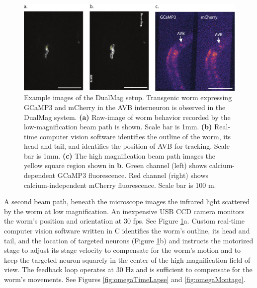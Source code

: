 \begin{figure}  %
\includegraphics[width=\textwidth]{figures/omegaDualMagImagesWithScale}
\caption[Example images from the DualMag setup.]{Example images of the DualMag setup. Transgenic worm expressing GCaMP3 and mCherry in the AVB interneuron is observed in the DualMag system. \textbf{(a)} Raw-image of worm behavior recorded by the low-magnification beam path is shown. Scale bar is 1mm.  \textbf{(b)} Real-time computer vision software identifies the outline of the worm, its head and tail, and identifies the position of AVB for tracking. Scale bar is 1mm. \textbf{(c)} The high magnification beam path images the yellow square region shown in \textbf{b}. Green channel (left) shows calcium-dependent GCaMP3 fluorescence. Red channel (right) shows calcium-independent mCherry fluorescence. Scale bar is 100 \textmu m.
\label{fig:omegaSampleImages}}
\end{figure}

A second beam path, beneath the microscope images the infrared light scattered by the worm at low magnification. An inexpensive USB CCD camera monitors the worm's position and orientation at 30 fps. See Figure \ref{fig:omegaSampleImages}a. Custom real-time computer vision software written in C identifies the worm's outline, its head and tail,  and the location of targeted neurons (Figure \ref{fig:omegaSampleImages}b) and instructs the motorized stage to adjust its stage velocity to compensate for the worm's motion and to keep the targeted neuron squarely in the center of the high-magnification field of view. The feedback loop operates at 30 Hz and is sufficient to compensate for the worm's movements. See Figures \ref{fig:omegaTimeLapse} and \ref{fig:omegaMontage}.


